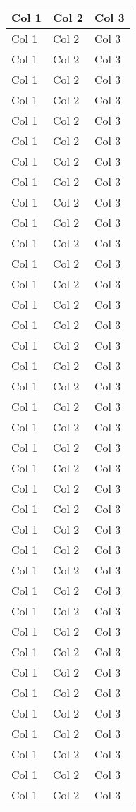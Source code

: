\documentclass[11pt]{article} %
\begin{document}
\begin{longtable}{|p{8.2cm}|p{1.5cm}|p{3cm}|}
Col 1& Col 2 & Col 3\\ \hline
Col 1& Col 2 & Col 3\\ \hline
Col 1& Col 2 & Col 3\\ \hline
Col 1& Col 2 & Col 3\\ \hline
Col 1& Col 2 & Col 3\\ \hline
Col 1& Col 2 & Col 3\\ \hline
Col 1& Col 2 & Col 3\\ \hline
Col 1& Col 2 & Col 3\\ \hline
Col 1& Col 2 & Col 3\\ \hline
Col 1& Col 2 & Col 3\\ \hline
Col 1& Col 2 & Col 3\\ \hline
Col 1& Col 2 & Col 3\\ \hline
Col 1& Col 2 & Col 3\\ \hline
Col 1& Col 2 & Col 3\\ \hline
Col 1& Col 2 & Col 3\\ \hline
Col 1& Col 2 & Col 3\\ \hline
Col 1& Col 2 & Col 3\\ \hline
Col 1& Col 2 & Col 3\\ \hline
Col 1& Col 2 & Col 3\\ \hline
Col 1& Col 2 & Col 3\\ \hline
Col 1& Col 2 & Col 3\\ \hline
Col 1& Col 2 & Col 3\\ \hline
Col 1& Col 2 & Col 3\\ \hline
Col 1& Col 2 & Col 3\\ \hline
Col 1& Col 2 & Col 3\\ \hline
Col 1& Col 2 & Col 3\\ \hline
Col 1& Col 2 & Col 3\\ \hline
Col 1& Col 2 & Col 3\\ \hline
Col 1& Col 2 & Col 3\\ \hline
Col 1& Col 2 & Col 3\\ \hline
Col 1& Col 2 & Col 3\\ \hline
Col 1& Col 2 & Col 3\\ \hline
Col 1& Col 2 & Col 3\\ \hline
Col 1& Col 2 & Col 3\\ \hline
Col 1& Col 2 & Col 3\\ \hline
Col 1& Col 2 & Col 3\\ \hline
Col 1& Col 2 & Col 3\\ \hline
Col 1& Col 2 & Col 3\\ \hline
Col 1& Col 2 & Col 3\\ \hline

\end{longtable}




\newpage
\end{document}

